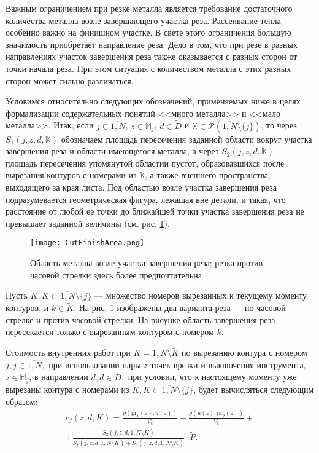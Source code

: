 Важным ограничением при резке металла является требование достаточного
количества металла возле завершающего участка реза.
Рассеивание тепла особенно важно на финишном участке.
В свете этого ограничения большую значимость приобретает направление реза.
Дело в том,
что при резе в разных направлениях участок завершения реза
также оказывается с разных сторон от точки начала реза.
При этом ситуация с количеством металла
с этих разных сторон может сильно различаться.

Условимся относительно следующих обозначений,
применяемых ниже в целях формализации
содержательных понятий <<много металла>> и <<мало металла>>.
Итак, если
$j\in \overline{1,N}$,
$z\in \mathbb{M}_j$,
$d\in \tilde{D}$ и
$\mathbb{K}\in \mathcal{P}(\overline{1,N}\setminus \{j\})$,
то через
$S_1(j,z,d,\mathbb{K})$ обозначаем площадь пересечения заданной
области вокруг участка завершения реза и области имеющегося металла,
а через
$S_2(j,z,d,\mathbb{K})$ --- площадь пересечения упомянутой областии пустот,
образовавшихся после вырезания контуров с номерами из $\mathbb{K}$,
а также внешнего пространства, выходящего за края листа.
Под областью возле участка завершения реза подразумевается геометрическая фигура,
лежащая вне детали, и такая,
что расстояние от любой ее точки до ближайшей точки участка
завершения реза не превышает заданной величины
(см. рис. \ref{FinishCutArea}).

\begin{figure}[h]
  \begin{center}
  \texttt{[image: CutFinishArea.png]}
  \caption{
    Область металла возле участка завершения реза;
    резка против часовой стрелки здесь более предпочтительна
    }
  \label{FinishCutArea}
  \end{center}
\end{figure}

Пусть
$\tilde{K}, \tilde{K}\subset \overline{1,N}\setminus \{j\}$
--- множество номеров вырезанных к текущему моменту контуров,
и $k\in \tilde{K}$.
На рис. \ref{FinishCutArea}
изображены два варианта реза ---
по часовой стрелке и против часовой стрелки.
На рисунке область завершения реза пересекается только с вырезанным
контуром с номером $k$.

Стоимость внутренних работ
при $K=\overline{1,N}\setminus \tilde{K}$
по вырезанию контура с номером $j,j\in \overline{1,N},$
при использовании пары $z$ точек врезки и выключения инструмента,
$z\in \mathbb{M}_j$,
в направлении $d,d\in \tilde{D},$ при условии,
что к настоящему моменту уже вырезаны контура с номерами из
$\tilde{K},\tilde{K}\subset \overline{1,N}\setminus \{j\}$,
будет вычисляться следующим образом:
\begin{equation}\label{IntPrice}
  \begin{array}{c}
  c_j(z,d,K)=\frac{\rho(\mbox{pr}_1(z),u(z))}{V_c}+
  \frac{\rho(u(z),\mbox{pr}_2(z))}{V_c}+\\
  +\frac{S_2(j,z,d,\overline{1,N}\setminus K)}{S_1(j,z,d,\overline{1,N}\setminus K)+
  S_2(j,z,d,\overline{1,N}\setminus K)}\cdot\tilde{P}
  .
  \end{array}
\end{equation}

